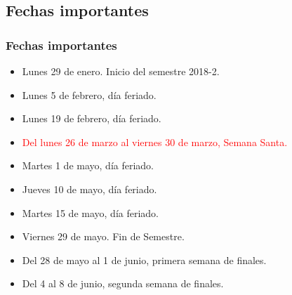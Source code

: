 \subsection{Fechas importantes}
\begin{frame}
\frametitle{Fechas importantes}
\begin{itemize}[<+->]
\item Lunes 29 de enero. Inicio del semestre 2018-2.
\item Lunes 5 de febrero, día feriado.
\item Lunes 19 de febrero, día feriado.
\item \textcolor{red}{Del lunes 26 de marzo al viernes 30 de marzo, Semana Santa.}
\item Martes 1 de mayo, día feriado.
\item Jueves 10 de mayo, día feriado.
\item Martes 15 de mayo, día feriado.
\item Viernes 29 de mayo. Fin de Semestre.
\item Del 28 de mayo al 1 de junio, primera semana de finales.
\item Del 4 al 8 de junio, segunda semana de finales.
\end{itemize}
\end{frame}
